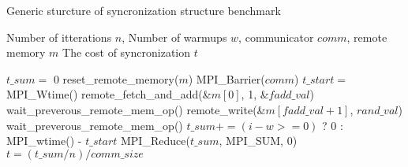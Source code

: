 \begin{algorithm}
  \caption{Generic sturcture of syncronization structure benchmark}
  \label{alg:sync_struct_bmark}
  \begin{algorithmic}[1]
    \Require Number of itterations $n$, Number of warmups $w$, communicator $comm$, remote memory $m$
    \Ensure The cost of syncronization $t$
    
    \State $t\_sum =$ 0
            \State reset\_remote\_memory($m$)
        \EndIf
        \State MPI\_Barrier($comm$)
        \State $t\_start =$ MPI\_Wtime()
        \State remote\_fetch\_and\_add(\&$m[0]$, 1, \&$fadd\_val$)
        \State wait\_preverous\_remote\_mem\_op()
        \State remote\_write(\&$m[fadd\_val+1]$, $rand\_val$)
        \State wait\_preverous\_remote\_mem\_op()
        \State $t\_sum += (i-w >= 0)$ ? 0 : MPI\_wtime() - $t\_start$
    \EndFor
    \State MPI\_Reduce($t\_sum$, MPI\_SUM, 0) 
    \State $t = (t\_sum/n)/comm\_size$ 
  \end{algorithmic}
\end{algorithm}